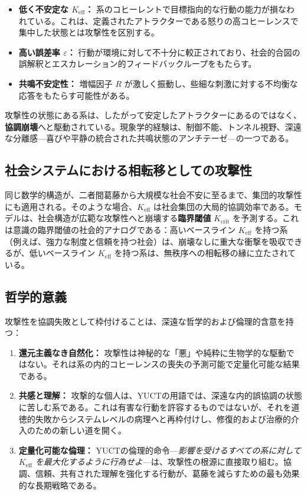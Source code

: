 \documentclass[12pt,a4paper]{article}
\begin{document}
	\begin{itemize}
		\item \textbf{低く不安定な \(K_{\mathrm{eff}}\)：} 系のコヒーレントで目標指向的な行動の能力が損なわれている。これは、定義されたアトラクターである怒りの高コヒーレンスで集中した状態とは攻撃性を区別する。
		\item \textbf{高い誤差率 \(\varepsilon\)：} 行動が環境に対して不十分に較正されており、社会的合図の誤解釈とエスカレーション的フィードバックループをもたらす。
		\item \textbf{共鳴不安定性：} 増幅因子 \(R\) が激しく振動し、些細な刺激に対する不均衡な応答をもたらす可能性がある。
	\end{itemize}
	
	攻撃性の状態にある系は、したがって安定したアトラクターにあるのではなく、\textbf{協調崩壊}へと駆動されている。現象学的経験は、制御不能、トンネル視野、深遠な分離感—喜びや平静の統合された共鳴状態のアンチテーゼ—の一つである。
	
	\subsection{社会システムにおける相転移としての攻撃性}
	
	同じ数学的構造が、二者間葛藤から大規模な社会不安に至るまで、集団的攻撃性にも適用される。そのような場合、\(K_{\mathrm{eff}}\) は社会集団の大局的協調効率である。モデルは、社会構造が広範な攻撃性へと崩壊する\textbf{臨界閾値} \(K_{\mathrm{crit}}\) を予測する。これは意識の臨界閾値の社会的アナログである：高いベースライン \(K_{\mathrm{eff}}\) を持つ系（例えば、強力な制度と信頼を持つ社会）は、崩壊なしに重大な衝撃を吸収できるが、低いベースライン \(K_{\mathrm{eff}}\) を持つ系は、無秩序への相転移の縁に立たされている。
	
	\subsection{哲学的意義}
	
	攻撃性を協調失敗として枠付けることは、深遠な哲学的および倫理的含意を持つ：
	
	\begin{enumerate}
		\item \textbf{還元主義なき自然化：} 攻撃性は神秘的な「悪」や純粋に生物学的な駆動ではない。それは系の内的コヒーレンスの喪失の予測可能で定量化可能な結果である。
		\item \textbf{共感と理解：} 攻撃的な個人は、YUCTの用語では、深遠な内的誤協調の状態に苦しむ系である。これは有害な行動を許容するものではないが、それを道徳的失敗からシステムレベルの病理へと再枠付けし、修復的および治療的介入のための新しい道を開く。
		\item \textbf{定量化可能な倫理：} YUCTの倫理的命令—\textit{影響を受けるすべての系に対して \(K_{\mathrm{eff}}\) を最大化するように行為せよ}—は、攻撃性の根源に直接取り組む。協調、信頼、共有された理解を強化する行動が、葛藤を減らすための最も効果的な長期戦略である。
	\end{enumerate}
	
\end{document}

